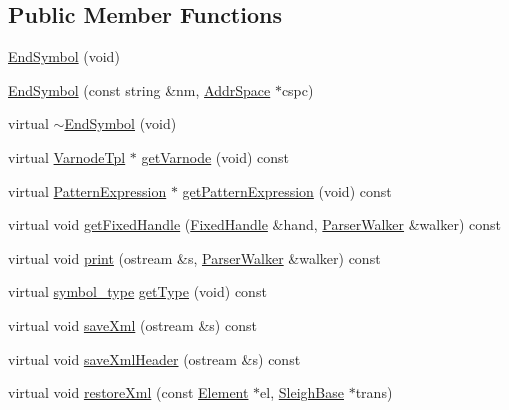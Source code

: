 \subsection*{Public Member Functions}
\begin{DoxyCompactItemize}
\item 
\mbox{\hyperlink{class_end_symbol_a1b3175a92a757b3d22e8a311421b57f3}{End\+Symbol}} (void)
\item 
\mbox{\hyperlink{class_end_symbol_a796ceddba9cf357f920b8e3bca6b14ab}{End\+Symbol}} (const string \&nm, \mbox{\hyperlink{class_addr_space}{Addr\+Space}} $\ast$cspc)
\item 
virtual \mbox{\hyperlink{class_end_symbol_a832ebd0b18ed3942f1af64eb75336a9e}{$\sim$\+End\+Symbol}} (void)
\item 
virtual \mbox{\hyperlink{class_varnode_tpl}{Varnode\+Tpl}} $\ast$ \mbox{\hyperlink{class_end_symbol_a1d1cbb76194a73d62eed37ee0e182c8c}{get\+Varnode}} (void) const
\item 
virtual \mbox{\hyperlink{class_pattern_expression}{Pattern\+Expression}} $\ast$ \mbox{\hyperlink{class_end_symbol_a950a96cd8076dd9e98057751d23aa6de}{get\+Pattern\+Expression}} (void) const
\item 
virtual void \mbox{\hyperlink{class_end_symbol_a077a2986de808e3aec22ef7fe2dad5a8}{get\+Fixed\+Handle}} (\mbox{\hyperlink{struct_fixed_handle}{Fixed\+Handle}} \&hand, \mbox{\hyperlink{class_parser_walker}{Parser\+Walker}} \&walker) const
\item 
virtual void \mbox{\hyperlink{class_end_symbol_ab80ec6e31015b71ceb133aea5ec8d10b}{print}} (ostream \&s, \mbox{\hyperlink{class_parser_walker}{Parser\+Walker}} \&walker) const
\item 
virtual \mbox{\hyperlink{class_sleigh_symbol_aba70f7f332fd63488c5ec4bd7807db41}{symbol\+\_\+type}} \mbox{\hyperlink{class_end_symbol_a0eef9ec04d733bbbb18ddf0c72e1ed9b}{get\+Type}} (void) const
\item 
virtual void \mbox{\hyperlink{class_end_symbol_a282237b2af7aa91526261d94580c77b2}{save\+Xml}} (ostream \&s) const
\item 
virtual void \mbox{\hyperlink{class_end_symbol_a78ad9229b9bab6735c31cd1fd0342729}{save\+Xml\+Header}} (ostream \&s) const
\item 
virtual void \mbox{\hyperlink{class_end_symbol_a4b319014daff5bfe82e79d3b7e7b6402}{restore\+Xml}} (const \mbox{\hyperlink{class_element}{Element}} $\ast$el, \mbox{\hyperlink{class_sleigh_base}{Sleigh\+Base}} $\ast$trans)
\end{DoxyCompactItemize}
